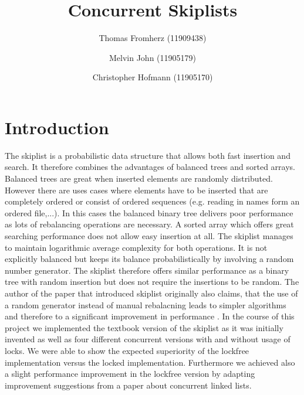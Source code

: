 \documentclass{article}
\begin{document}
\title{Concurrent Skiplists}
\author{Thomas Fromherz (11909438)
\and
Melvin John (11905179)
\and
Christopher Hofmann (11905170)}
\maketitle

\tableofcontents

\section{Introduction}
The skiplist is a probabilistic data structure that allows both fast insertion and search. It therefore combines the advantages of balanced trees and sorted arrays. Balanced trees are great when inserted elements are randomly distributed. However there are uses cases where elements have to be inserted that are completely ordered or consist of ordered sequences (e.g. reading in names form an ordered file,...). In this cases the balanced binary tree delivers poor performance as lots of rebalancing operations are necessary. A sorted array which offers great searching performance does not allow easy insertion at all. The skiplist manages to maintain logarithmic average complexity for both operations. It is not explicitly balanced but keeps its balance probabilistically by involving a random number generator. The skiplist therefore offers similar performance as a binary tree with random insertion but does not require the insertions to be random. The author of the paper that introduced skiplist originally also claims, that the use of a random generator instead of manual rebalacning leads to simpler algorithms and therefore to a significant improvement in performance \cite{skiplist}. In the course of this project we implemented the textbook version of the skiplist as it was initially invented as well as four different concurrent versions with and without usage of locks. We were able to show the expected superiority of the lockfree implementation versus the locked implementation. Furthermore we achieved also a slight performance improvement in the lockfree version by adapting improvement suggestions from a paper about concurrent linked lists.
\end{document}
